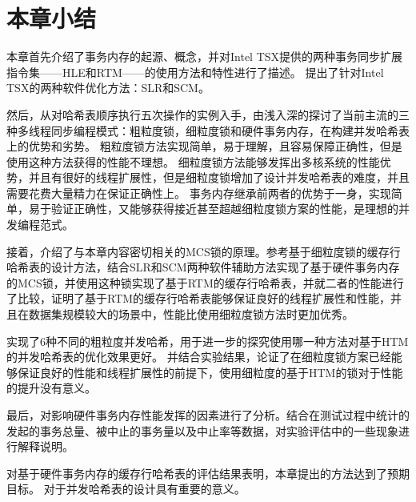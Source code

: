 \section{本章小结}
本章首先介绍了事务内存的起源、概念，并对Intel TSX提供的两种事务同步扩展指令集——HLE和RTM——的使用方法和特性进行了描述。
提出了针对Intel TSX的两种软件优化方法：SLR和SCM。

然后，从对哈希表顺序执行五次操作的实例入手，由浅入深的探讨了当前主流的三种多线程同步编程模式：粗粒度锁，细粒度锁和硬件事务内存，在构建并发哈希表上的优势和劣势。
粗粒度锁方法实现简单，易于理解，且容易保障正确性，但是使用这种方法获得的性能不理想。
细粒度锁方法能够发挥出多核系统的性能优势，并且有很好的线程扩展性，但是细粒度锁增加了设计并发哈希表的难度，并且需要花费大量精力在保证正确性上。
事务内存继承前两者的优势于一身，实现简单，易于验证正确性，又能够获得接近甚至超越细粒度锁方案的性能，是理想的并发编程范式。

接着，介绍了与本章内容密切相关的MCS锁的原理。参考基于细粒度锁的缓存行哈希表的设计方法，结合SLR和SCM两种软件辅助方法实现了基于硬件事务内存的MCS锁，并使用这种锁实现了基于RTM的缓存行哈希表，并就二者的性能进行了比较，证明了基于RTM的缓存行哈希表能够保证良好的线程扩展性和性能，并且在数据集规模较大的场景中，性能比使用细粒度锁方法时更加优秀。

实现了6种不同的粗粒度并发哈希，用于进一步的探究使用哪一种方法对基于HTM的并发哈希表的优化效果更好。
并结合实验结果，论证了在细粒度锁方案已经能够保证良好的性能和线程扩展性的前提下，使用细粒度的基于HTM的锁对于性能的提升没有意义。

最后，对影响硬件事务内存性能发挥的因素进行了分析。结合在测试过程中统计的发起的事务总量、被中止的事务量以及中止率等数据，对实验评估中的一些现象进行解释说明。

对基于硬件事务内存的缓存行哈希表的评估结果表明，本章提出的方法达到了预期目标。
对于并发哈希表的设计具有重要的意义。
